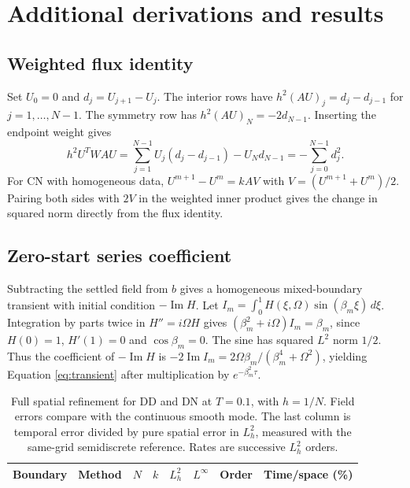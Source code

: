 \clearpage
\section{Additional derivations and results}\label{app:results}
\subsection{Weighted flux identity}
Set $U_0=0$ and $d_j=U_{j+1}-U_j$. The interior rows have $h^2(AU)_j=d_j-d_{j-1}$ for $j=1,\ldots,N-1$. The symmetry row has $h^2(AU)_N=-2d_{N-1}$. Inserting the endpoint weight gives
\begin{equation}
h^2 U^TWAU=\sum_{j=1}^{N-1}U_j(d_j-d_{j-1})-U_Nd_{N-1}=-\sum_{j=0}^{N-1}d_j^2.
\end{equation}
For CN with homogeneous data, $U^{m+1}-U^m=kAV$ with $V=(U^{m+1}+U^m)/2$. Pairing both sides with $2V$ in the weighted inner product gives the change in squared norm directly from the flux identity.

\subsection{Zero-start series coefficient}
Subtracting the settled field from $b$ gives a homogeneous mixed-boundary transient with initial condition $-\operatorname{Im}H$. Let $I_m=\int_0^1H(\xi,\Omega)\sin(\beta_m\xi)\,d\xi$. Integration by parts twice in $H''=i\Omega H$ gives $(\beta_m^2+i\Omega)I_m=\beta_m$, since $H(0)=1$, $H'(1)=0$ and $\cos\beta_m=0$. The sine has squared $L^2$ norm $1/2$. Thus the coefficient of $-\operatorname{Im}H$ is $-2\operatorname{Im}I_m=2\Omega\beta_m/(\beta_m^4+\Omega^2)$, yielding Equation \eqref{eq:transient} after multiplication by $e^{-\beta_m^2\tau}$.

\begin{table}[!ht]\centering
\caption{Full spatial refinement for DD and DN at $T=0.1$, with $h=1/N$. Field errors compare with the continuous smooth mode. The last column is temporal error divided by pure spatial error in $L^2_h$, measured with the same-grid semidiscrete reference. Rates are successive $L^2_h$ orders.}
\small
\begin{tabular}{@{}llrrrrrr@{}}\toprule
Boundary & Method & $N$ & $k$ & $L^2_h$ & $L^\infty$ & Order & Time/space (\%) \\ \midrule
%
\end{tabular}
\end{table}

